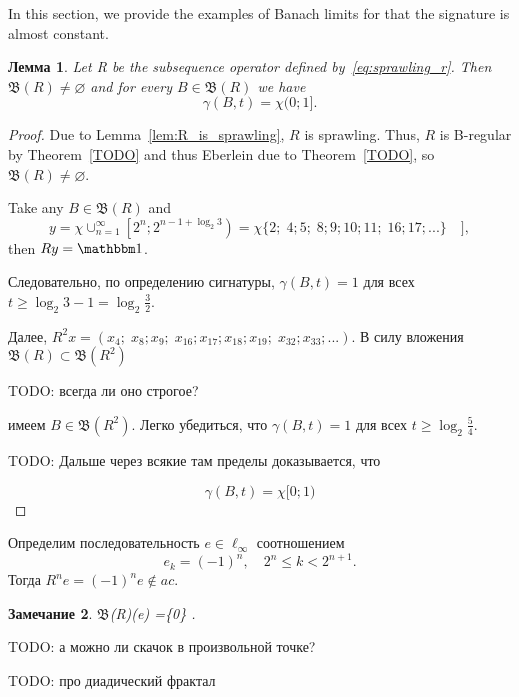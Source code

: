 \documentclass[a4paper,14pt]{article} %
\newcommand{\B}{\ensuremath{\mathfrak{B}}}
\newcommand{\one}{\ensuremath{\mathbbm 1}}
\theoremstyle{plain}
\newtheorem{lemma}{Лемма}[section]
\newtheorem{theorem}[lemma]{Теорема}
\newtheorem{remark}[lemma]{Замечание}
\begin{document}
In this section, we provide the examples of Banach limits for that the signature is almost constant.

\begin{lemma}
	Let R be the subsequence operator
	defined by~\eqref{eq:sprawling_r}.
	Then $\B(R) \ne\varnothing$ and for every $B\in \B(R)$ we have
	\begin{equation}
		\gamma(B, t) = \chi(0;1]
		.
	\end{equation}
\end{lemma}

\begin{proof}
	Due to Lemma~\ref{lem:R_is_sprawling}, $R$ is sprawling.
	Thus, $R$ is B-regular by Theorem~\ref{TODO} and thus Eberlein due to Theorem~\ref{TODO},
	so $\B(R)\ne \varnothing$.

	Take any $B \in \mathfrak{B}(R)$ and
	\begin{equation}
		y = \chi \cup_{n=1}^\infty \left[ 2^n; 2^{n-1+\log_2 3}\right) =
		\chi \{ 2; \; 4;5; \; 8;9;10;11; \; 16;17;... \}\quad]
		,
	\end{equation}
	then $Ry=\one$.

	Следовательно, по определению сигнатуры, $\gamma(B,t) = 1$ для всех $t \geq \log_2 3 - 1 = \log_2 \frac32$.

	Далее, $R^2 x = (x_4; \; x_8; x_9;\; x_{16}; x_{17}; x_{18}; x_{19}; \; x_{32}; x_{33};...)$.
	В силу вложения $\mathfrak{B}(R)\subset\mathfrak{B}(R^2)$

	TODO: всегда ли оно строгое?

	имеем $B\in\mathfrak{B}(R^2)$.
	Легко убедиться, что $\gamma(B,t) = 1$ для всех $t \geq \log_2 \frac54$.

	TODO: Дальше через всякие там пределы доказывается, что

	\begin{equation}
		\label{eq:gamma_chi_0_1}
		\gamma(B,t) = \chi{[}0;1)
	\end{equation}





\end{proof}


	Определим последовательность $e\in\ell_\infty$ соотношением
	\begin{equation}
		e_k = (-1)^n, \quad 2^n \leq k < 2^{n+1}
		.
	\end{equation}
	Тогда $R^n e = (-1)^n e \notin ac$.

\begin{remark}
	\B(R)(e) =\{0\}
	.
\end{remark}

TODO: а можно ли скачок в произвольной точке?

TODO: про диадический фрактал

\printbibliography{}
\end{document}
